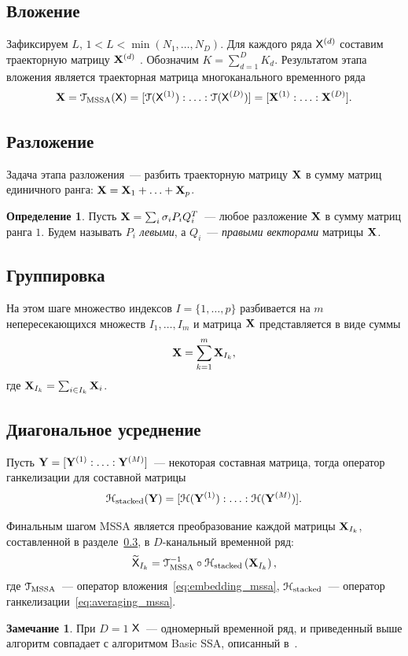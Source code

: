 \documentclass[specialist,
substylefile = spbu_report.rtx,
subf,href,colorlinks=true, 12pt]{disser}
\theoremstyle{definition}
\newtheorem{definition}{Определение}
\newtheorem{remark}{Замечание}
\begin{document}
\subsection{Вложение}\label{sect:embedding}
Зафиксируем $L$, $1<L<\min(N_1,\ldots,N_D)$. Для каждого ряда $\mathsf{X}^{(d)}$ составим траекторную матрицу $\mathbf{X}^{(d)}$ . Обозначим $K=\sum_{d=1}^D K_d$. Результатом этапа вложения является траекторная матрица многоканального временного ряда
\begin{equation}\label{eq:embedding_mssa}
	\mathbf{X}=\EuScript{T}_{\text{MSSA}}(\mathsf{X})=[\EuScript{T}(\mathsf{X}^{(1)}):\ldots:\EuScript{T}(\mathsf{X}^{(D)})]=[\mathbf{X}^{(1)}:\ldots:\mathbf{X}^{(D)}].
\end{equation}
\subsection{Разложение}
Задача этапа разложения~--- разбить траекторную матрицу $\mathbf{X}$ в сумму матриц единичного ранга: $\mathbf{X}=\mathbf{X}_1+\ldots+\mathbf{X}_p$.
\begin{definition}\label{def:decomp}
	Пусть $\mathbf{X}=\sum_i \sigma_i P_i Q_i^T$~--- любое разложение $\mathbf{X}$ в сумму матриц ранга $1$. Будем называть $P_i$ \emph{левыми}, а $Q_i$~--- \emph{правыми векторами} матрицы $\mathbf{X}$.
\end{definition}

\subsection{Группировка}\label{sect:grouping}
На этом шаге множество индексов $I=\{1,\ldots,p\}$ разбивается на $m$ непересекающихся множеств $I_1,\ldots,I_m$ и матрица $\mathbf{X}$ представляется в виде суммы
\[
	\mathbf{X} = \sum_{k=1}^m \mathbf{X}_{I_k},
\]
где $\mathbf{X}_{I_k}=\sum_{i\in I_k}\mathbf{X}_i$.

\subsection{Диагональное усреднение}\label{sect:averaging}
Пусть $\mathbf{Y}=[\mathbf{Y}^{(1)}:\ldots:\mathbf{Y}^{(M)}]$~--- некоторая составная матрица, тогда оператор ганкелизации для составной матрицы
\begin{equation}\label{eq:averaging_mssa}
\EuScript{H}_{\text{stacked}}(\mathbf{Y})=[\EuScript{H}(\mathbf{Y}^{(1)}):\ldots:\EuScript{H}(\mathbf{Y}^{(M)})].
\end{equation}

Финальным шагом MSSA является преобразование каждой матрицы $\mathbf{X}_{I_k}$, составленной в разделе~\ref{sect:grouping}, в $D$-канальный временной ряд:
\begin{equation}
	\widetilde{\mathsf{X}}_{I_k}=\EuScript{T}_{\text{MSSA}}^{-1}\circ\EuScript{H}_{\text{stacked}}\left(\mathbf{X}_{I_k}\right),
\end{equation}
где $\EuScript{T}_{\text{MSSA}}$~--- оператор вложения~\eqref{eq:embedding_mssa}, $\EuScript{H}_{\text{stacked}}$~--- оператор ганкелизации~\eqref{eq:averaging_mssa}.
\begin{remark}
При $D=1$ $\mathsf{X}$~--- одномерный временной ряд, и приведенный выше алгоритм совпадает с алгоритмом Basic SSA, описанный в~\cite{Golyandina2001}.
\end{remark}
\end{document}
